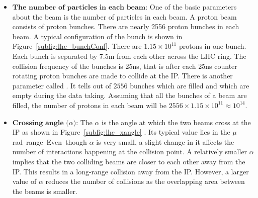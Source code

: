 \begin{itemize}[leftmargin=*]		
\item $\textbf{The number of particles in each beam}$: One of the basic parameters about the
    	beam is the number of particles in each beam. A proton beam consists of proton
    	bunches. There are nearly 2556 proton bunches in each beam. A typical
	configuration of the bunch is shown in Figure~\ref{subfig:lhc_bunchConf}. There are
    	$1.15\times 10^{11}$ protons in one bunch. Each bunch is separated by 7.5\unit{m} from 
	each other across the LHC ring. The collision frequency of the 
    	bunches is 25\unit{ns}, that is after each 25\unit{ns} counter rotating proton bunches
    	are made to collide at the IP. There is another parameter called
    	. It tells out of $2556$ bunches which are filled
    	and which are empty during the data taking. Assuming that all the bunches of
    	a beam are filled, the number of protons in each beam will be 
    	$2556 \times 1.15\times 10^{11} \approx 10^{14}$.
\item $\textbf{Crossing angle ($\alpha$)}$: The $\alpha$ is the angle at which the
	two beams cross at the IP as shown in Figure~\ref{subfig:lhc_xangle}
    	. Its typical value lies in the \unit{$\mu$rad} range. Even though $\alpha$ is 
	very small, a slight change in it affects the number of interactions happening at the
    	collision point. A relatively smaller $\alpha$ implies that the two colliding
    	beams are closer to each other away from the IP. This results in a long-range collision 
	away from the IP. However, a larger value of $\alpha$ reduces the number of collisions as 
	the overlapping area between the beams is smaller.
    	\begin{figure}
    	\centering
    	\hfil

\end{figure}
\end{itemize}
